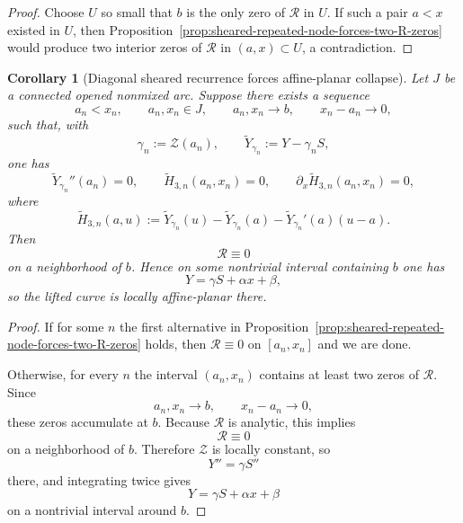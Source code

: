 \documentclass[11pt,a4paper]{amsart}
\theoremstyle{plain}
\newtheorem{corollary}[theorem]{Corollary}
\theoremstyle{definition}
\begin{document}
\begin{proof}
Choose $U$ so small that $b$ is the only zero of $\mathcal R$ in $U$. If such a
pair $a<x$ existed in $U$, then
Proposition~\ref{prop:sheared-repeated-node-forces-two-R-zeros} would produce
two interior zeros of $\mathcal R$ in $(a,x)\subset U$, a contradiction.
\end{proof}

\begin{corollary}[Diagonal sheared recurrence forces affine-planar collapse]
\label{cor:diagonal-sheared-recurrence-forces-affine-planar-collapse}
Let $J$ be a connected opened nonmixed arc. Suppose there exists a sequence
\[
a_n<x_n,
\qquad
a_n,x_n\in J,
\qquad
a_n,x_n\to b,
\qquad
x_n-a_n\to 0,
\]
such that, with
\[
\gamma_n:=\mathcal Z(a_n),
\qquad
\widetilde Y_{\gamma_n}:=Y-\gamma_n S,
\]
one has
\[
\widetilde Y_{\gamma_n}''(a_n)=0,
\qquad
\widetilde H_{3,n}(a_n,x_n)=0,
\qquad
\partial_x\widetilde H_{3,n}(a_n,x_n)=0,
\]
where
\[
\widetilde H_{3,n}(a,u):=
\widetilde Y_{\gamma_n}(u)-\widetilde Y_{\gamma_n}(a)-\widetilde Y_{\gamma_n}'(a)(u-a).
\]
Then
\[
\mathcal R\equiv 0
\]
on a neighborhood of $b$. Hence on some nontrivial interval containing $b$ one
has
\[
Y=\gamma S+\alpha x+\beta,
\]
so the lifted curve is locally affine-planar there.
\end{corollary}

\begin{proof}
If for some $n$ the first alternative in
Proposition~\ref{prop:sheared-repeated-node-forces-two-R-zeros} holds, then
$\mathcal R\equiv 0$ on $[a_n,x_n]$ and we are done.

Otherwise, for every $n$ the interval $(a_n,x_n)$ contains at least two zeros of
$\mathcal R$. Since
\[
a_n,x_n\to b,
\qquad
x_n-a_n\to 0,
\]
these zeros accumulate at $b$. Because $\mathcal R$ is analytic, this implies
\[
\mathcal R\equiv 0
\]
on a neighborhood of $b$. Therefore $\mathcal Z$ is locally constant, so
\[
Y''=\gamma S''
\]
there, and integrating twice gives
\[
Y=\gamma S+\alpha x+\beta
\]
on a nontrivial interval around $b$.
\end{proof}
\end{document}
